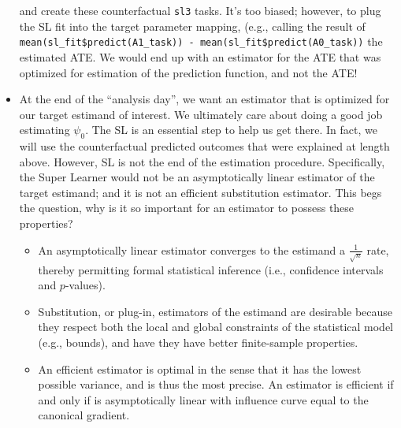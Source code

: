 \documentclass[12pt, krantz2,]{krantz}
\theoremstyle{definition}
\theoremstyle{definition}
\theoremstyle{definition}
\newcommand{\1}{\mathbbm{1}}
\begin{document}
\begin{itemize}
  and create these counterfactual \texttt{sl3} tasks. It's too biased; however, to
  plug the SL fit into the target parameter mapping, (e.g., calling the result
  of \texttt{mean(sl\_fit\$predict(A1\_task))\ -\ mean(sl\_fit\$predict(A0\_task))} the
  estimated ATE. We would end up with an estimator for the ATE that was
  optimized for estimation of the prediction function, and not the ATE!
\item
  At the end of the ``analysis day'', we want an estimator that is optimized for
  our target estimand of interest. We ultimately care about doing a good job
  estimating \(\psi_0\). The SL is an essential step to help us get there. In
  fact, we will use the counterfactual predicted outcomes that were explained
  at length above. However, SL is not the end of the estimation procedure.
  Specifically, the Super Learner would not be an asymptotically linear
  estimator of the target estimand; and it is not an efficient substitution
  estimator. This begs the question, why is it so important for an estimator to
  possess these properties?

  \begin{itemize}
  \item
    An asymptotically linear estimator converges to the estimand a
    \(\frac{1}{\sqrt{n}}\) rate, thereby permitting formal statistical inference
    (i.e., confidence intervals and \(p\)-values).
  \item
    Substitution, or plug-in, estimators of the estimand are desirable because
    they respect both the local and global constraints of the statistical model
    (e.g., bounds), and have they have better finite-sample properties.
  \item
    An efficient estimator is optimal in the sense that it has the lowest
    possible variance, and is thus the most precise. An estimator is efficient
    if and only if is asymptotically linear with influence curve equal to the
    canonical gradient.


\end{itemize}
\end{itemize}
\end{document}
